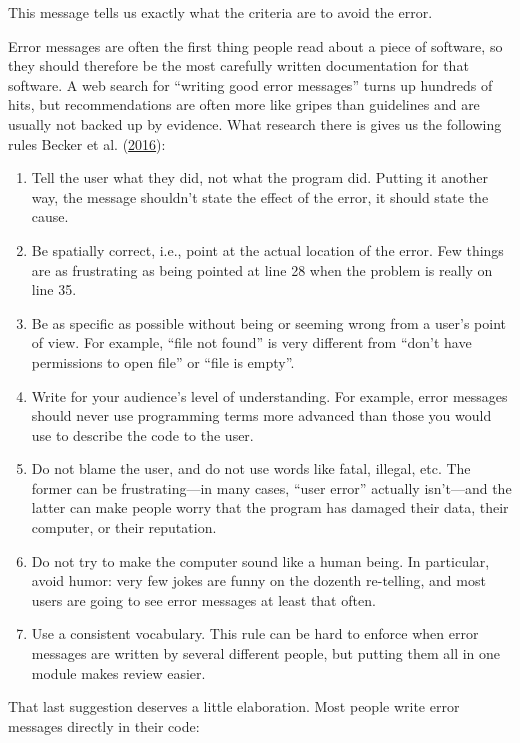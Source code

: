 \documentclass[
]{krantz}
\begin{document}
This message tells us exactly what the criteria are to avoid the error.

Error messages are often the first thing people read about a piece of software,
so they should therefore be the most carefully written documentation for that software.
A web search for ``writing good error messages'' turns up hundreds of hits,
but recommendations are often more like gripes than guidelines
and are usually not backed up by evidence.
What research there is gives us the following rules Becker et al. (\protect\hyperlink{ref-Beck2016}{2016}):

\begin{enumerate}
\def\labelenumi{\arabic{enumi}.}
\item
  Tell the user what they did, not what the program did.
  Putting it another way,
  the message shouldn't state the effect of the error,
  it should state the cause.
\item
  Be spatially correct,
  i.e.,
  point at the actual location of the error.
  Few things are as frustrating as being pointed at line 28
  when the problem is really on line 35.
\item
  Be as specific as possible without being or seeming wrong
  from a user's point of view.
  For example,
  ``file not found'' is very different from ``don't have permissions to open file'' or ``file is empty''.
\item
  Write for your audience's level of understanding.
  For example,
  error messages should never use programming terms more advanced than
  those you would use to describe the code to the user.
\item
  Do not blame the user, and do not use words like fatal, illegal, etc.
  The former can be frustrating---in many cases, ``user error'' actually isn't---and
  the latter can make people worry that the program has damaged their data,
  their computer,
  or their reputation.
\item
  Do not try to make the computer sound like a human being.
  In particular, avoid humor:
  very few jokes are funny on the dozenth re-telling,
  and most users are going to see error messages at least that often.
\item
  Use a consistent vocabulary.
  This rule can be hard to enforce when error messages are written by several different people,
  but putting them all in one module makes review easier.
\end{enumerate}

That last suggestion deserves a little elaboration.
Most people write error messages directly in their code:
\end{document}
